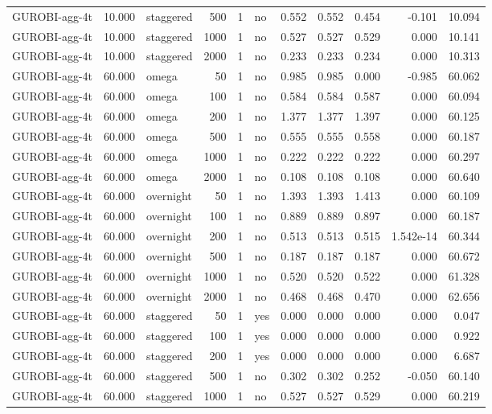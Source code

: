 \begin{table}[htbp]
\begin{tabular}{lrlrrlrrrrr}
GUROBI-agg-4t & 10.000 & staggered & 500 & 1 & no & 0.552 & 0.552 & 0.454 & -0.101 & 10.094 \\
GUROBI-agg-4t & 10.000 & staggered & 1000 & 1 & no & 0.527 & 0.527 & 0.529 & 0.000 & 10.141 \\
GUROBI-agg-4t & 10.000 & staggered & 2000 & 1 & no & 0.233 & 0.233 & 0.234 & 0.000 & 10.313 \\
GUROBI-agg-4t & 60.000 & omega & 50 & 1 & no & 0.985 & 0.985 & 0.000 & -0.985 & 60.062 \\
GUROBI-agg-4t & 60.000 & omega & 100 & 1 & no & 0.584 & 0.584 & 0.587 & 0.000 & 60.094 \\
GUROBI-agg-4t & 60.000 & omega & 200 & 1 & no & 1.377 & 1.377 & 1.397 & 0.000 & 60.125 \\
GUROBI-agg-4t & 60.000 & omega & 500 & 1 & no & 0.555 & 0.555 & 0.558 & 0.000 & 60.187 \\
GUROBI-agg-4t & 60.000 & omega & 1000 & 1 & no & 0.222 & 0.222 & 0.222 & 0.000 & 60.297 \\
GUROBI-agg-4t & 60.000 & omega & 2000 & 1 & no & 0.108 & 0.108 & 0.108 & 0.000 & 60.640 \\
GUROBI-agg-4t & 60.000 & overnight & 50 & 1 & no & 1.393 & 1.393 & 1.413 & 0.000 & 60.109 \\
GUROBI-agg-4t & 60.000 & overnight & 100 & 1 & no & 0.889 & 0.889 & 0.897 & 0.000 & 60.187 \\
GUROBI-agg-4t & 60.000 & overnight & 200 & 1 & no & 0.513 & 0.513 & 0.515 & 1.542e-14 & 60.344 \\
GUROBI-agg-4t & 60.000 & overnight & 500 & 1 & no & 0.187 & 0.187 & 0.187 & 0.000 & 60.672 \\
GUROBI-agg-4t & 60.000 & overnight & 1000 & 1 & no & 0.520 & 0.520 & 0.522 & 0.000 & 61.328 \\
GUROBI-agg-4t & 60.000 & overnight & 2000 & 1 & no & 0.468 & 0.468 & 0.470 & 0.000 & 62.656 \\
GUROBI-agg-4t & 60.000 & staggered & 50 & 1 & yes & 0.000 & 0.000 & 0.000 & 0.000 & 0.047 \\
GUROBI-agg-4t & 60.000 & staggered & 100 & 1 & yes & 0.000 & 0.000 & 0.000 & 0.000 & 0.922 \\
GUROBI-agg-4t & 60.000 & staggered & 200 & 1 & yes & 0.000 & 0.000 & 0.000 & 0.000 & 6.687 \\
GUROBI-agg-4t & 60.000 & staggered & 500 & 1 & no & 0.302 & 0.302 & 0.252 & -0.050 & 60.140 \\
GUROBI-agg-4t & 60.000 & staggered & 1000 & 1 & no & 0.527 & 0.527 & 0.529 & 0.000 & 60.219 \\

\end{tabular}
\end{table}
